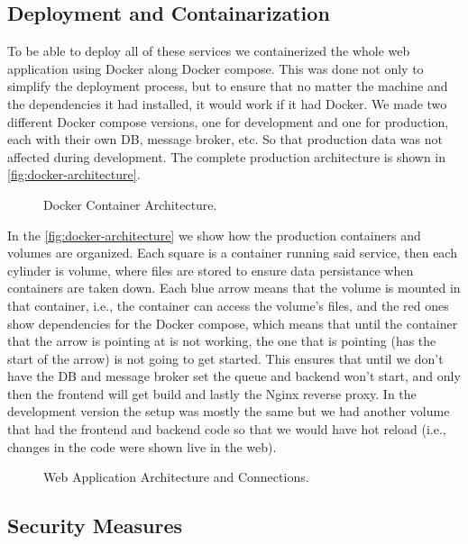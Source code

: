 \subsection{Deployment and Containarization}



To be able to deploy all of these services we containerized the whole web application using Docker \autocite{merkelDockerLightweightLinux2014} along Docker compose.
This was done not only to simplify the deployment process,
but to ensure that no matter the machine and the dependencies it had installed,
it would work if it had Docker.
We made two different Docker compose versions, one for development and one for production,
each with their own \ac{DB}, message broker, etc. So that production data was not affected during development.
The complete production architecture is shown in \autoref{fig:docker-architecture}.

\begin{figure}[!htbp]
    \centering
    
    \caption{Docker Container Architecture.}
    \label{fig:docker-architecture}
\end{figure}

In the \autoref{fig:docker-architecture} we show how the production containers and volumes are organized.
Each square is a container running said service,
then each cylinder is volume, where files are stored to ensure data persistance when containers are taken down.
Each blue arrow means that the volume is mounted in that container, i.e., the container can access the volume's files,
and the red ones show dependencies for the Docker compose,
which means that until the container that the arrow is pointing at is not working,
the one that is pointing (has the start of the arrow) is not going to get started.
This ensures that until we don't have the \ac{DB} and message broker set
the queue and backend won't start,
and only then the frontend will get build
and lastly the Nginx reverse proxy.
In the development version the setup was mostly the same
but we had another volume that had the frontend and backend code
so that we would have hot reload (i.e., changes in the code were shown live in the web).


\begin{figure}[htbp]
    \centering
     
    \caption{Web Application Architecture and Connections.}
    \label{fig:app-architecture}
\end{figure}


\subsection{Security Measures}

